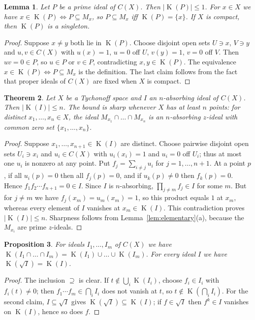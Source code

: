 \documentclass[11pt]{amsart}
\newtheorem{theorem}{Theorem}[section]
\newtheorem{lemma}[theorem]{Lemma}
\newtheorem{proposition}[theorem]{Proposition}
\theoremstyle{definition}
\theoremstyle{remark}
\DeclareMathOperator{\K}{K}
\begin{document}
\begin{lemma}
\label{lem:prime-K}
Let $P$ be a prime ideal of $C(X)$. Then $|\K(P)|\le1$. For $x\in X$ we
have $x\in\K(P)\iff P\subseteq M_x$, so $P\subseteq M_x$ iff
$\K(P)=\{x\}$. If $X$ is compact, then $\K(P)$ is a singleton.
\end{lemma}

\begin{proof}
Suppose $x\ne y$ both lie in $\K(P)$. Choose disjoint open sets
$U\ni x$, $V\ni y$ and $u,v\in C(X)$ with $u(x)=1$, $u=0$ off $U$,
$v(y)=1$, $v=0$ off $V$. Then $uv=0\in P$, so $u\in P$ or $v\in P$,
contradicting $x,y\in\K(P)$. The equivalence $x\in\K(P)\iff P\subseteq M_x$
is the definition. The last claim follows from the fact that proper
ideals of $C(X)$ are fixed when $X$ is compact.
\end{proof}

\begin{theorem}
\label{thm:K-bound}
Let $X$ be a Tychonoff space and $I$ an $n$-absorbing ideal of $C(X)$.
Then $|\K(I)|\le n$. The bound is sharp whenever $X$ has at least $n$ points: for distinct
$x_1,\dots,x_n\in X$, the ideal $M_{x_1}\cap\dots\cap M_{x_n}$ is an
$n$-absorbing $z$-ideal with common zero set $\{x_1,\dots,x_n\}$.
\end{theorem}

\begin{proof}
Suppose $x_1,\dots,x_{n+1}\in\K(I)$ are distinct. Choose pairwise
disjoint open sets $U_i\ni x_i$ and $u_i\in C(X)$ with $u_i(x_i)=1$ and
$u_i=0$ off $U_i$; thus at most one $u_i$ is nonzero at any point.
Put $f_j=\sum_{i\ne j}u_i$ for $j=1,\dots,n+1$.
At a point $p$, if all $u_i(p)=0$ then all $f_j(p)=0$, and if
$u_k(p)\ne0$ then $f_k(p)=0$. Hence $f_1f_2\cdots f_{n+1}=0\in I$.
Since $I$ is $n$-absorbing, $\prod_{j\ne m}f_j\in I$ for some $m$.
But for $j\neq m$ we have $f_j(x_m)=u_m(x_m)=1$, so this product equals
$1$ at $x_m$, whereas every element of $I$ vanishes at $x_m\in\K(I)$.
This contradiction proves $|\K(I)|\le n$.
Sharpness follows from Lemma~\ref{lem:elementary}(a), because the $M_{x_i}$
are prime $z$-ideals.
\end{proof}

\begin{proposition}
\label{prop:K-intersection}
For ideals $I_1,\dots,I_m$ of $C(X)$ we have $\K(I_1\cap\dots\cap I_m)=\K(I_1)\cup\dots\cup\K(I_m)$.
For every ideal $I$ we have $\K(\sqrt I)=\K(I)$.
\end{proposition}

\begin{proof}
The inclusion $\supseteq$ is clear. If $t\notin\bigcup_i\K(I_i)$, choose
$f_i\in I_i$ with $f_i(t)\ne0$; then $f_1\cdots f_m\in\bigcap_iI_i$ does not
vanish at $t$, so $t\notin\K(\bigcap_iI_i)$. For the second claim, $I\subseteq\sqrt I$ gives
$\K(\sqrt I)\subseteq\K(I)$; if $f\in\sqrt I$ then $f^k\in I$ vanishes
on $\K(I)$, hence so does $f$.
\end{proof}
\end{document}
